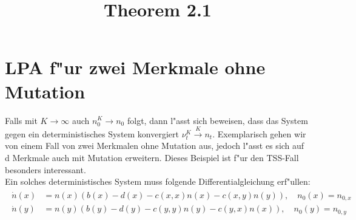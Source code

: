 \documentclass[11pt,a4paper]{article}
\title{Theorem 2.1}
\theoremstyle{plain}
\begin{document}
\maketitle
\section{LPA f"ur zwei Merkmale ohne Mutation}
Falls mit $ K \to \infty $ auch $ n_0^K \to n_0 $ folgt, dann l"asst sich beweisen, dass das System gegen ein deterministisches System konvergiert $ \nu_t^K \xrightarrow{K} n_t $. Exemplarisch gehen wir von einem Fall von zwei Merkmalen ohne Mutation aus, jedoch l"asst es sich auf d Merkmale auch mit Mutation erweitern. Dieses Beispiel ist f"ur den TSS-Fall besonders interessant.\\
Ein solches deterministisches System muss folgende Differentialgleichung erf"ullen:
\begin{align}
\begin{split}
	\dot{n}(x) &= n(x) \left( b(x) - d(x) - c(x,x) n(x) - c(x,y) n(y) \right), \quad n_0(x) = n_{0,x}\\
	\dot{n}(y) &= n(y) \left( b(y) - d(y) - c(y,y) n(y) - c(y,x) n(x) \right), \quad n_0(y) = n_{0,y} \label{Differentialgleichung}
\end{split}
\end{align}
\end{document}
